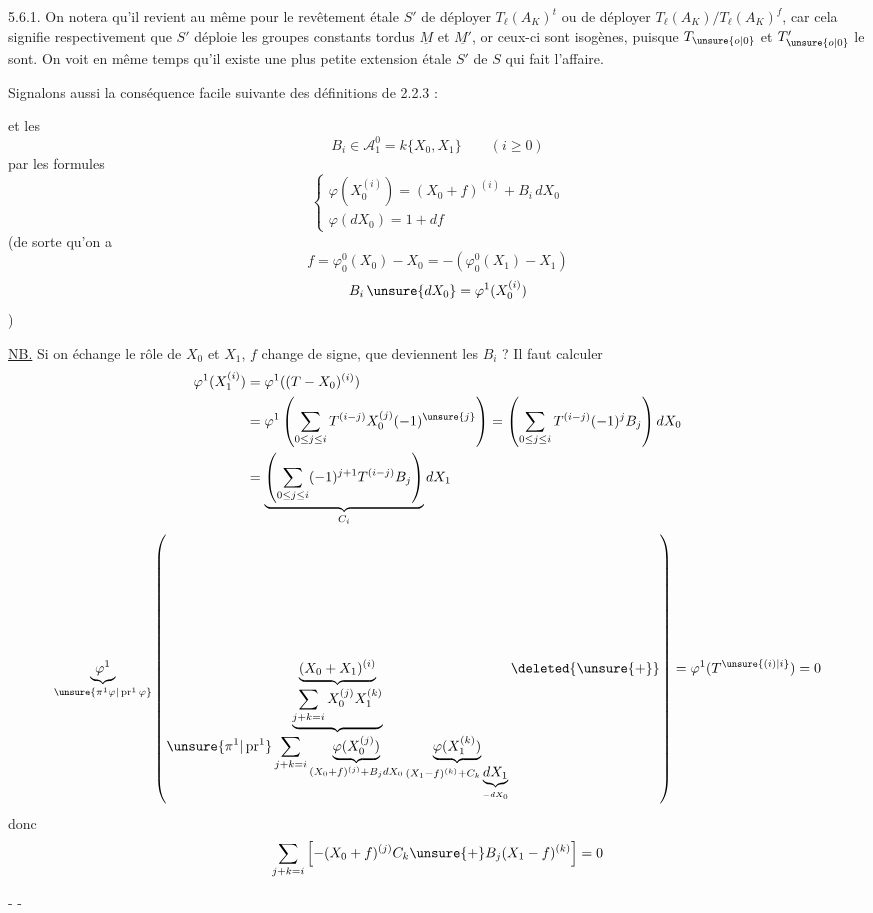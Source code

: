 5.6.1. On notera qu'il revient au même pour le revêtement étale $S'$ de déployer $T_\ell(A_K)^t$ ou de déployer $T_\ell(A_K)/T_\ell(A_K)^f$, car cela signifie respectivement que $S'$ déploie les groupes constants tordus $\underline M$ et $\underline{M'}$, or ceux-ci sont isogènes, puisque $T_{\unsure{o|0}}$ et $T'_{\unsure{o|0}}$ le sont. On voit en même temps qu'il existe une plus petite extension étale $S'$ de $S$ qui fait l'affaire.

Signalons aussi la conséquence facile suivante des définitions de 2.2.3 :

\margin{-}

et les
\[
\boxed{B_i\in\mathcal A_1^0=k\{X_0,X_1\}\qquad(i\ge0)}
\]
par les formules
\[
\begin{cases}
\varphi(X_0^{(i)})=(X_0+f)^{(i)}+B_i\,dX_0\\
\varphi(dX_0)=1+df
\end{cases}
\]
(de sorte qu'on a
\[
f=\varphi_0^0(X_0)-X_0=-(\varphi_0^0(X_1)-X_1)
\]
\[
B_i\,\unsure{dX_0}=\varphi^1(X_0^{(i)})
\]
)

\uline{NB.} Si on échange le rôle de $X_0$ et $X_1$, $f$ change de signe, que deviennent les $B_i$ ? Il faut calculer
\[
\begin{aligned}
\varphi^1(X_1^{(i)})&=\varphi^1((T-X_0)^{(i)})\\
&=\varphi^1\left(\sum_{0\le j\le i}T^{(i-j)}X_0^{(j)}(-1)^{\unsure{j}}\right)
=\left(\sum_{0\le j\le i}T^{(i-j)}(-1)^jB_j\right)dX_0\\
&=\underbrace{\left(\sum_{0\le j\le i}(-1)^{j+1}T^{(i-j)}B_j\right)}_{C_i}dX_1
\end{aligned}
\]
\[
\underbrace{\varphi^1}_{\unsure{\pi^1\varphi|\operatorname{pr}^1\varphi}}
\left(
\underbrace{(X_0+X_1)^{(i)}}_{
\underbrace{\displaystyle\sum_{j+k=i}X_0^{(j)}X_1^{(k)}}_{
\displaystyle\unsure{\pi^1|\operatorname{pr}^1}\sum_{j+k=i}
\underbrace{\varphi(X_0^{(j)})}_{(X_0+f)^{(j)}+B_jdX_0}
\underbrace{\varphi(X_1^{(k)})}_{(X_1-f)^{(k)}+C_k\underbrace{dX_1}_{-dX_0}}
}}
\deleted{\unsure{+}}
\right)=\varphi^1(T^{\unsure{(i)|i}})=0
\]
donc
\[
\sum_{j+k=i}\left[-(X_0+f)^{(j)}C_k\unsure{+}B_j(X_1-f)^{(k)}\right]=0
\]

\begin{center}-  -\end{center}

